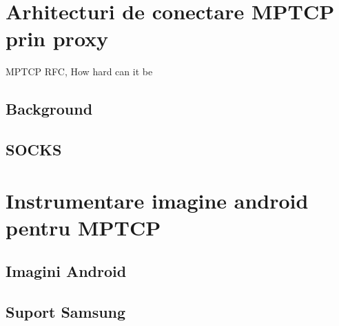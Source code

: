 \chapter{Arhitecturi de conectare  MPTCP prin proxy}
\label{sec:arch_upb}

MPTCP RFC\cite{rfc6824bis}, How hard can it be \cite{mptcp-nsdi}

\section{Background}
\section{SOCKS}


\chapter{Instrumentare imagine android pentru MPTCP}
\label{sec:arch_upb}


\section{Imagini Android}
\section{Suport Samsung}

